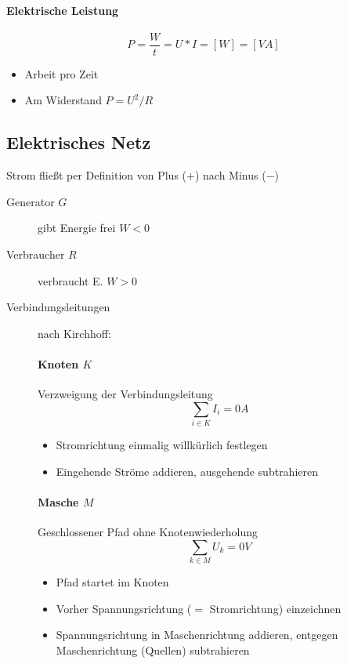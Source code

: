 \paragraph{Elektrische Leistung}

$$P = \frac{W}{t} = U * I = [W] = [VA]$$

\begin{itemize}
  \item Arbeit pro Zeit
  \item Am Widerstand $P = U^2 / R$
\end{itemize}

\subsection{Elektrisches Netz}


Strom flie\ss t per Definition von Plus ($+$) nach Minus ($-$)

\begin{description}
  \item[Generator $G$] gibt Energie frei $W < 0$
  \item[Verbraucher $R$] verbraucht E. $W > 0$
  \item[Verbindungsleitungen] nach Kirchhoff:
    \paragraph{Knoten $K$} Verzweigung der Verbindungsleitung
    $$\sum_{i \in K} I_i = 0 A$$

    \begin{itemize}
      \item Stromrichtung einmalig willkürlich festlegen
      \item Eingehende Ströme addieren, ausgehende subtrahieren
    \end{itemize}

    \paragraph{Masche $M$} Geschlossener Pfad ohne Knotenwiederholung
    $$\sum_{k \in M} U_k = 0 V$$

    \begin{itemize}
      \item Pfad startet im Knoten
      \item Vorher Spannungsrichtung ($=$ Stromrichtung) einzeichnen
      \item Spannungsrichtung in Maschenrichtung addieren, entgegen Maschenrichtung (Quellen) subtrahieren
    \end{itemize}
\end{description}

